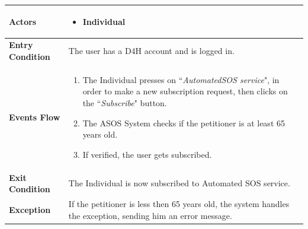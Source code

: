             \begin{table}[H]
            	\centering
                
                \begin{tabular}{|p{3cm}|p{8.2cm}|}
                    \hline
                    \textbf{Actors} & \begin{itemize}
                        \item Individual
                    \end{itemize} \\
                     \hline
                    \textbf{Entry Condition} & The user has a D4H account and is logged in. \\
                     \hline
                    \textbf{Events Flow} & \begin{enumerate}
                                               \item The Individual presses on
                                               ``\emph{AutomatedSOS service}", in order to make a new subscription request, then clicks on the ``\emph{Subscribe}" button.
                                               \item The ASOS System checks if the petitioner is at least 65 years old.
                                               \item If verified, the user gets subscribed.
                                           \end{enumerate} \\
                     \hline
                    \textbf{Exit Condition} & The Individual is now subscribed to Automated SOS service.\\
                     \hline
                    \textbf{Exception} & If the petitioner is less then 65 years old, the system handles the exception, sending him an error message. \\
                     \hline
                \end{tabular}  
            \end{table}
            
